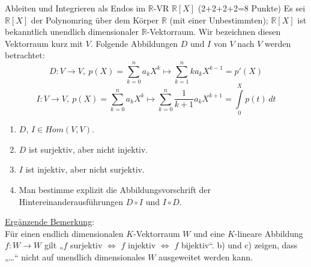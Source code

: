 \documentclass{uebblatt}
\begin{document}

\begin{aufgabe}{Ableiten und Integrieren als Endos im $\mathbb{R}$-VR $\mathbb{R}[X]$ (2+2+2+2=8 Punkte)}
Es sei $\mathbb{R}[X]$ der Polynomring über dem Körper $\mathbb{R}$ (mit einer Unbestimmten); $\mathbb{R}[X]$ ist bekanntlich unendlich dimensionaler $\mathbb{R}$-Vektorraum. Wir bezeichnen diesen Vektorraum kurz mit $V$. Folgende Abbildungen $D$ und $I$ von $V$ nach $V$ werden betrachtet:
$$D: V \to V, \> p(X) = \sum \limits_{k=0}^{n} a_k X^k \mapsto \sum \limits_{k=1}^{n} ka_k X^{k-1} = p'(X)$$
$$I: V \to V, \> p(X) = \sum \limits_{k=0}^{n} a_k X^k \mapsto \sum \limits_{k=0}^{n} \frac{1}{k+1} a_k X^{k+1} = \int \limits_{0}^{X}p(t) \, dt$$
\begin{enumerate}
\item $D$, $I \in Hom(V, V)$.
\item $D$ ist surjektiv, aber nicht injektiv.
\item $I$ ist injektiv, aber nicht surjektiv.
\item Man bestimme explizit die Abbildungsvorschrift der Hintereinanderausführungen $D \circ I$ und $I \circ D$.
\end{enumerate}
\underline{Ergänzende Bemerkung}:\\
Für einen endlich dimensionalen $K$-Vektorraum $W$ und eine $K$-lineare Abbildung $f : W \to W$ gilt „$f$ surjektiv $\Leftrightarrow$ $f$ injektiv $\Leftrightarrow$ $f$ bijektiv“. b) und c) zeigen, dass  „…“ nicht auf unendlich dimensionales $W$ ausgeweitet werden kann.
\end{aufgabe}
\end{document}

